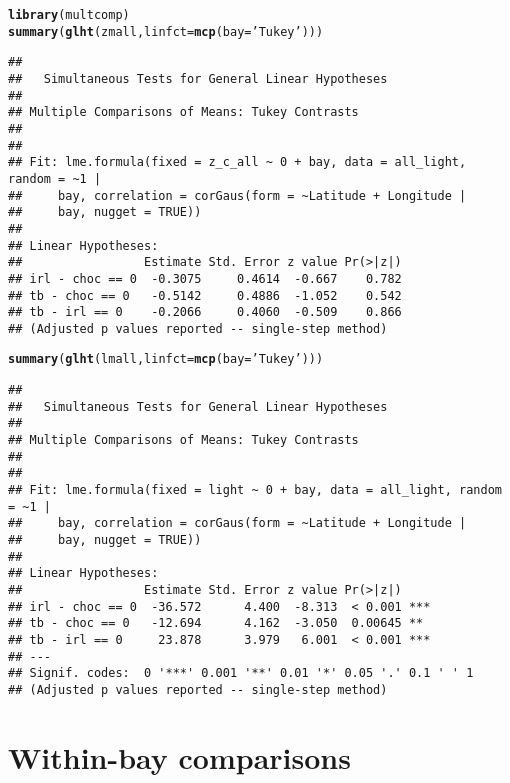 \documentclass[letterpaper,12pt]{article}\usepackage[]{graphicx}\usepackage[]{color}
\makeatletter
\newcommand{\hlstr}[1]{\textcolor[rgb]{0.192,0.494,0.8}{#1}}%
\newcommand{\hlstd}[1]{\textcolor[rgb]{0.345,0.345,0.345}{#1}}%
\newcommand{\hlkwc}[1]{\textcolor[rgb]{0.333,0.667,0.333}{#1}}%
\newcommand{\hlkwd}[1]{\textcolor[rgb]{0.737,0.353,0.396}{\textbf{#1}}}%
\newenvironment{kframe}{%
 \def\at@end@of@kframe{}%
 \ifinner\ifhmode%
  \def\at@end@of@kframe{\end{minipage}}%
  \begin{minipage}{\columnwidth}%
 \fi\fi%
 \def\FrameCommand##1{\hskip\@totalleftmargin \hskip-\fboxsep
 \colorbox{shadecolor}{##1}\hskip-\fboxsep
     \hskip-\linewidth \hskip-\@totalleftmargin \hskip\columnwidth}%
 \MakeFramed {\advance\hsize-\width
   \@totalleftmargin\z@ \linewidth\hsize
   \@setminipage}}%
 {\par\unskip\endMakeFramed%
 \at@end@of@kframe}
\newenvironment{knitrout}{}{} %
\makeatother
\begin{document}
\begin{knitrout}
\color{fgcolor}\begin{kframe}
\begin{alltt}
\hlkwd{library}\hlstd{(multcomp)}
\hlkwd{summary}\hlstd{(}\hlkwd{glht}\hlstd{(zmall,} \hlkwc{linfct} \hlstd{=} \hlkwd{mcp}\hlstd{(}\hlkwc{bay} \hlstd{=} \hlstr{'Tukey'}\hlstd{)))}
\end{alltt}
\begin{verbatim}
## 
## 	 Simultaneous Tests for General Linear Hypotheses
## 
## Multiple Comparisons of Means: Tukey Contrasts
## 
## 
## Fit: lme.formula(fixed = z_c_all ~ 0 + bay, data = all_light, random = ~1 | 
##     bay, correlation = corGaus(form = ~Latitude + Longitude | 
##     bay, nugget = TRUE))
## 
## Linear Hypotheses:
##                 Estimate Std. Error z value Pr(>|z|)
## irl - choc == 0  -0.3075     0.4614  -0.667    0.782
## tb - choc == 0   -0.5142     0.4886  -1.052    0.542
## tb - irl == 0    -0.2066     0.4060  -0.509    0.866
## (Adjusted p values reported -- single-step method)
\end{verbatim}
\begin{alltt}
\hlkwd{summary}\hlstd{(}\hlkwd{glht}\hlstd{(lmall,} \hlkwc{linfct} \hlstd{=} \hlkwd{mcp}\hlstd{(}\hlkwc{bay} \hlstd{=} \hlstr{'Tukey'}\hlstd{)))}
\end{alltt}
\begin{verbatim}
## 
## 	 Simultaneous Tests for General Linear Hypotheses
## 
## Multiple Comparisons of Means: Tukey Contrasts
## 
## 
## Fit: lme.formula(fixed = light ~ 0 + bay, data = all_light, random = ~1 | 
##     bay, correlation = corGaus(form = ~Latitude + Longitude | 
##     bay, nugget = TRUE))
## 
## Linear Hypotheses:
##                 Estimate Std. Error z value Pr(>|z|)    
## irl - choc == 0  -36.572      4.400  -8.313  < 0.001 ***
## tb - choc == 0   -12.694      4.162  -3.050  0.00645 ** 
## tb - irl == 0     23.878      3.979   6.001  < 0.001 ***
## ---
## Signif. codes:  0 '***' 0.001 '**' 0.01 '*' 0.05 '.' 0.1 ' ' 1
## (Adjusted p values reported -- single-step method)
\end{verbatim}
\end{kframe}
\end{knitrout}

\section{Within-bay comparisons}
\end{document}
